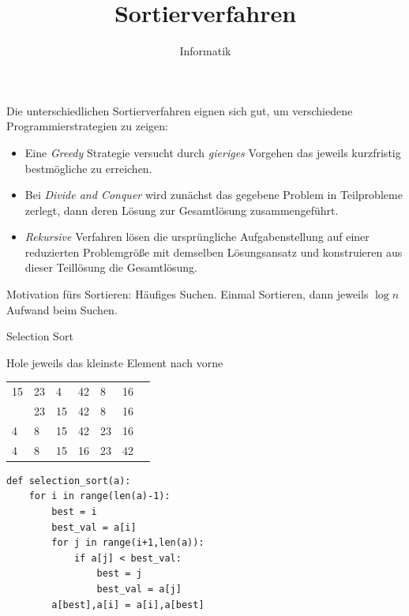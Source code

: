 \documentclass{beamer}
\begin{document}
\title{Sortierverfahren}   
\author{Informatik} 
\date{ } 


\lstset{language=Python, tabsize=4, showstringspaces=false,basicstyle=\footnotesize,mathescape=true}

\frame{\titlepage} 

\begin{frame}[fragile]

Die unterschiedlichen Sortierverfahren eignen sich gut, um verschiedene Programmierstrategien
zu zeigen: \pause
\begin{itemize}
\item Eine \textit{Greedy} Strategie versucht durch \textit{gieriges} Vorgehen das jeweils kurzfristig bestmögliche zu erreichen. \pause
\item Bei \textit{Divide and Conquer} wird zunächst das gegebene Problem in Teilprobleme zerlegt, dann deren Lösung zur Gesamtlösung zusammengeführt. \pause 
\item \textit{Rekursive} Verfahren lösen die ursprüngliche Aufgabenstellung auf einer reduzierten Problemgröße mit demselben Lösungsansatz und konstruieren aus dieser Teillösung die Gesamtlösung.
\end{itemize}

Motivation fürs Sortieren: \pause
 Häufiges Suchen. Einmal Sortieren, dann jeweils $\log n$ Aufwand beim Suchen.
\end{frame}


\begin{frame}[fragile]

Selection Sort 

\glqq Hole jeweils das kleinste Element nach vorne\grqq  

\begin{tabular}{lllllll}
15 & 23 & 4 & 42 & 8 & 16 \\ \pause
4 & 23 & 15 & 42 & 8 & 16 \\  
4 & 8 & 15 &  42 & 23 &  16  \\   
 4 & 8 & 15 & 16 & 23  &  42  \\ 
\end{tabular}
\end{frame}

\begin{frame}[fragile]
\begin{lstlisting} 
def selection_sort(a):
    for i in range(len(a)-1):
        best = i
        best_val = a[i]
        for j in range(i+1,len(a)):
            if a[j] < best_val:
                best = j
                best_val = a[j]
        a[best],a[i] = a[i],a[best]
 \end{lstlisting} 
\end{frame}
\end{document}
